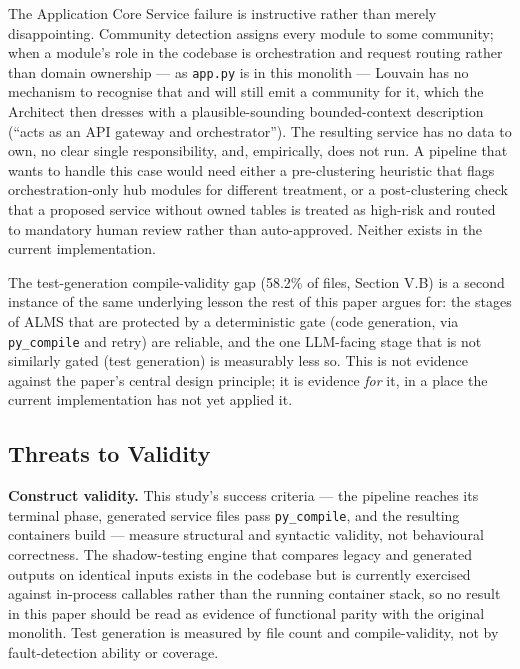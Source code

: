 \documentclass[conference]{IEEEtran}
\begin{document}
The Application Core Service failure is instructive rather than merely disappointing. Community detection assigns every module to some community; when a module's role in the codebase is orchestration and request routing rather than domain ownership --- as \texttt{app.py} is in this monolith --- Louvain has no mechanism to recognise that and will still emit a community for it, which the Architect then dresses with a plausible-sounding bounded-context description (``acts as an API gateway and orchestrator''). The resulting service has no data to own, no clear single responsibility, and, empirically, does not run. A pipeline that wants to handle this case would need either a pre-clustering heuristic that flags orchestration-only hub modules for different treatment, or a post-clustering check that a proposed service without owned tables is treated as high-risk and routed to mandatory human review rather than auto-approved. Neither exists in the current implementation.

The test-generation compile-validity gap (58.2\% of files, Section V.B) is a second instance of the same underlying lesson the rest of this paper argues for: the stages of ALMS that are protected by a deterministic gate (code generation, via \texttt{py\_compile} and retry) are reliable, and the one LLM-facing stage that is not similarly gated (test generation) is measurably less so. This is not evidence against the paper's central design principle; it is evidence \textit{for} it, in a place the current implementation has not yet applied it.

\subsection{Threats to Validity}

\textbf{Construct validity.} This study's success criteria --- the pipeline reaches its terminal phase, generated service files pass \texttt{py\_compile}, and the resulting containers build --- measure structural and syntactic validity, not behavioural correctness. The shadow-testing engine that compares legacy and generated outputs on identical inputs exists in the codebase but is currently exercised against in-process callables rather than the running container stack, so no result in this paper should be read as evidence of functional parity with the original monolith. Test generation is measured by file count and compile-validity, not by fault-detection ability or coverage.
\end{document}
